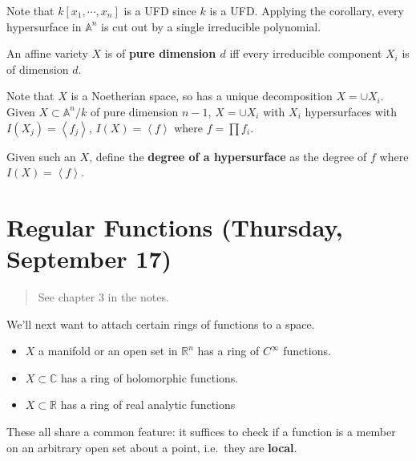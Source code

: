 \begin{example}

Note that \(k[x_1, \cdots, x_{n}]\) is a UFD since \(k\) is a UFD.
Applying the corollary, every hypersurface in \({\mathbb{A}}^n\) is cut
out by a single irreducible polynomial.

\end{example}

\begin{definition}

An affine variety \(X\) is of \textbf{pure dimension \(d\)} iff every
irreducible component \(X_i\) is of dimension \(d\).

\end{definition}

\begin{remark}

Note that \(X\) is a Noetherian space, so has a unique decomposition
\(X = \cup X_i\). Given \(X\subset {\mathbb{A}}^n/k\) of pure dimension
\(n-1\), \(X = \cup X_i\) with \(X_i\) hypersurfaces with
\(I(X_j) = \left\langle{f_j}\right\rangle\),
\(I(X) = \left\langle{f}\right\rangle\) where \(f = \prod f_i\).

\end{remark}

\begin{definition}

Given such an \(X\), define the \textbf{degree of a hypersurface} as the
degree of \(f\) where \(I(X) = \left\langle{f}\right\rangle\).

\end{definition}

\hypertarget{regular-functions-thursday-september-17}{%
\section{Regular Functions (Thursday, September
17)}\label{regular-functions-thursday-september-17}}

\begin{quote}
See chapter 3 in the notes.
\end{quote}

We'll next want to attach certain rings of functions to a space.

\begin{example}

\envlist

\begin{itemize}
\tightlist
\item
  \(X\) a manifold or an open set in \({\mathbb{R}}^n\) has a ring of
  \(C^\infty\) functions.
\item
  \(X \subset {\mathbb{C}}\) has a ring of holomorphic functions.
\item
  \(X\subset {\mathbb{R}}\) has a ring of real analytic functions
\end{itemize}

These all share a common feature: it suffices to check if a function is
a member on an arbitrary open set about a point, i.e.~they are
\textbf{local}.

\end{example}

